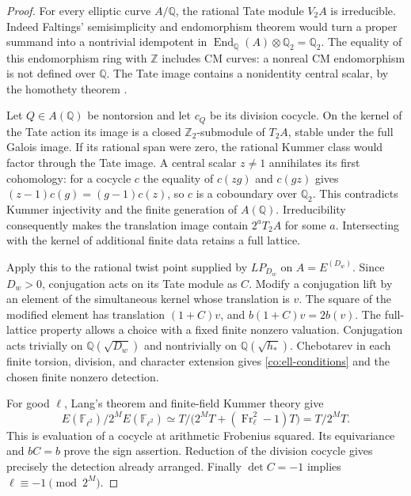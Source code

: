 \begin{proof}
For every elliptic curve $A/\mathbb Q$, the rational Tate module $V_2A$
is irreducible.  Indeed Faltings' semisimplicity and endomorphism theorem
\cite[\S1, assertions (a),(b)]{Faltings1983} would turn a proper
summand into a nontrivial idempotent in
$\operatorname{End}_{\mathbb Q}(A)\otimes\mathbb Q_2=\mathbb Q_2$.
The equality of this endomorphism ring with $\mathbb Z$ includes CM
curves: a nonreal CM endomorphism is not defined over $\mathbb Q$.
The Tate image contains a nonidentity central scalar, by the homothety
theorem \cite[\S2, Theorem~3 and paragraph~7]{Bogomolov1981Points}.

Let $Q\in A(\mathbb Q)$ be nontorsion and let $c_Q$ be its division
cocycle.  On the kernel of the Tate action its image is a closed
$\mathbb Z_2$-submodule of $T_2A$, stable under the full Galois image.
If its rational span were zero, the rational Kummer class would factor
through the Tate image.  A central scalar $z\neq1$ annihilates its
first cohomology: for a cocycle $c$ the equality of $c(zg)$ and $c(gz)$
gives $(z-1)c(g)=(g-1)c(z)$, so $c$ is a coboundary over $\mathbb Q_2$.
This contradicts Kummer injectivity and the finite generation of
$A(\mathbb Q)$.  Irreducibility consequently makes the translation
image contain $2^aT_2A$ for some $a$.  Intersecting with the kernel of
additional finite data retains a full lattice.

Apply this to the rational twist point supplied by $LP_{D_w}$ on
$A=E^{(D_w)}$.  Since $D_w>0$, conjugation acts on its Tate module as
$C$.  Modify a conjugation lift by an element of the simultaneous
kernel whose translation is $v$.  The square of the modified element
has translation $(1+C)v$, and $b(1+C)v=2b(v)$.  The full-lattice
property allows a choice with a fixed finite nonzero valuation.
Conjugation acts trivially on $\mathbb Q(\sqrt{D_w})$ and nontrivially
on $\mathbb Q(\sqrt{h_*})$.  Chebotarev in each finite torsion,
division, and character extension gives \eqref{co:ell-conditions}
and the chosen finite nonzero detection.

For good $\ell$, Lang's theorem and finite-field Kummer theory give
\[
 E(\mathbb F_{\ell^2})/2^M E(\mathbb F_{\ell^2})
 \simeq T/\bigl(2^MT+(\operatorname{Fr}_\ell^2-1)T\bigr)=T/2^MT.
\]
This is evaluation of a cocycle at arithmetic Frobenius squared.
Its equivariance and $bC=b$ prove the sign assertion.  Reduction of
the division cocycle gives precisely the detection already arranged.
Finally $\det C=-1$ implies $\ell\equiv-1\pmod {2^M}$.
\end{proof}

